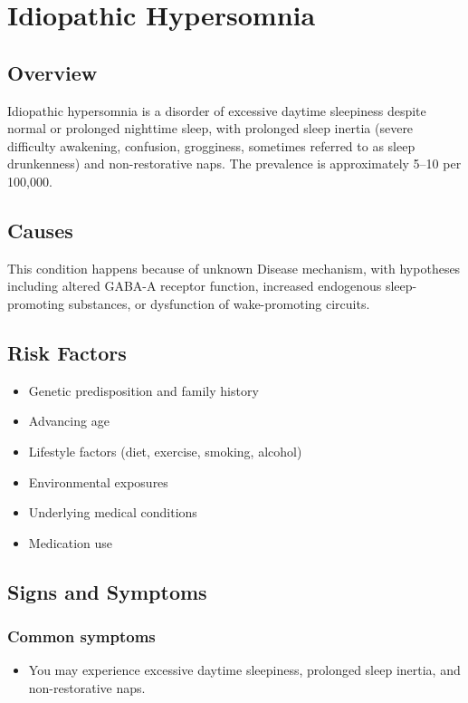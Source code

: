 \chapter{Idiopathic Hypersomnia}
\label{sec:Idiopathic Hypersomnia}

\section{Overview}
Idiopathic hypersomnia is a disorder of excessive daytime sleepiness despite normal or prolonged nighttime sleep, with prolonged sleep inertia (severe difficulty awakening, confusion, grogginess, sometimes referred to as sleep drunkenness) and non-restorative naps. The prevalence is approximately 5--10 per 100,000.
\section{Causes}
This condition happens because of unknown Disease mechanism, with hypotheses including altered GABA-A receptor function, increased endogenous sleep-promoting substances, or dysfunction of wake-promoting circuits.     
\section{Risk Factors}

\begin{itemize}[noitemsep]
  \item Genetic predisposition and family history
  \item Advancing age
  \item Lifestyle factors (diet, exercise, smoking, alcohol)
  \item Environmental exposures
  \item Underlying medical conditions
  \item Medication use
\end{itemize}
\section{Signs and Symptoms}

\subsection{Common symptoms}
\begin{itemize}[noitemsep]
  \item You may experience excessive daytime sleepiness, prolonged sleep inertia, and non-restorative naps. 
  \end{itemize}

